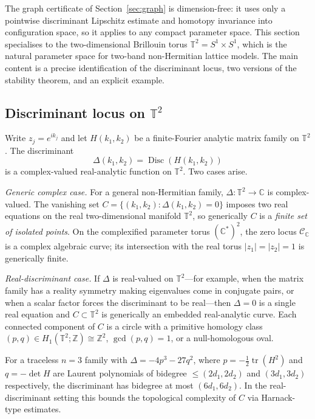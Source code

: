 \documentclass[11pt]{article}
\numberwithin{equation}{section}
\DeclareMathOperator{\Disc}{Disc}
\newcommand{\bbC}{\mathbb C}
\newcommand{\bbZ}{\mathbb Z}
\newcommand{\bbT}{\mathbb T}
\newcommand{\cC}{\mathcal C}
\begin{document}
The graph certificate of Section~\ref{sec:graph} is
dimension-free: it uses only a pointwise discriminant Lipschitz estimate and
homotopy invariance into configuration space, so it applies to any compact
parameter space.  This section specialises to the two-dimensional Brillouin
torus \(\bbT^2=S^1\times S^1\), which is the natural parameter space for
two-band non-Hermitian lattice models.  The main content is a precise
identification of the discriminant locus, two versions of the stability
theorem, and an explicit example.

\subsection{Discriminant locus on \(\bbT^2\)}

Write \(z_j=e^{ik_j}\) and let \(H(k_1,k_2)\) be a finite-Fourier analytic
matrix family on \(\bbT^2\).  The discriminant
\[
  \Delta(k_1,k_2)=\Disc(H(k_1,k_2))
\]
is a complex-valued real-analytic function on \(\bbT^2\).  Two cases arise.

\emph{Generic complex case.}
For a general non-Hermitian family, \(\Delta:\bbT^2\to\bbC\) is
complex-valued.  The vanishing set
\(C=\{(k_1,k_2):\Delta(k_1,k_2)=0\}\)
imposes two real equations on the real two-dimensional manifold \(\bbT^2\),
so generically \(C\) is a \emph{finite set of isolated points}.  On the
complexified parameter torus \((\bbC^*)^2\), the zero locus \(\cC_\bbC\)
is a complex algebraic curve; its intersection with the real torus
\(|z_1|=|z_2|=1\) is generically finite.

\emph{Real-discriminant case.}
If \(\Delta\) is real-valued on \(\bbT^2\)---for example, when the matrix
family has a reality symmetry making eigenvalues come in conjugate pairs, or
when a scalar factor forces the discriminant to be real---then \(\Delta=0\)
is a single real equation and \(C\subset\bbT^2\) is generically an embedded
real-analytic curve.  Each connected component of \(C\) is a circle with a
primitive homology class \((p,q)\in H_1(\bbT^2;\bbZ)\cong\bbZ^2\),
\(\gcd(p,q)=1\), or a null-homologous oval.

For a traceless \(n=3\) family with \(\Delta=-4p^3-27q^2\), where
\(p=-\frac12\operatorname{tr}(H^2)\) and \(q=-\det H\) are Laurent
polynomials of bidegree \(\le(2d_1,2d_2)\) and \((3d_1,3d_2)\) respectively,
the discriminant has bidegree at most \((6d_1,6d_2)\).  In the
real-discriminant setting this bounds the topological complexity of \(C\) via
Harnack-type estimates.
\end{document}
